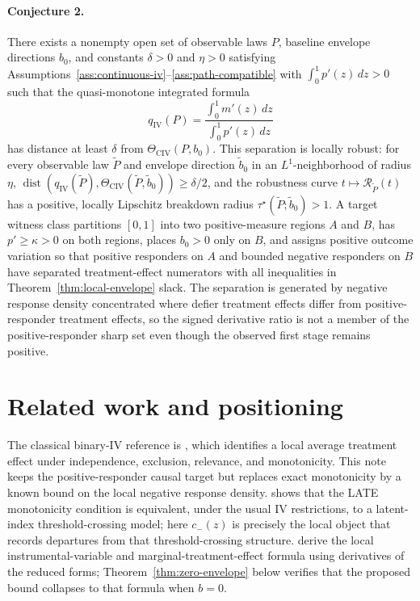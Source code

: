 \documentclass[11pt]{article}
\theoremstyle{definition}
\theoremstyle{plain}
\theoremstyle{remark}
\begin{document}
\paragraph{Conjecture 2.}\label{conj:strict-separation}
There exists a nonempty open set of observable laws \(P\), baseline envelope directions \(b_0\), and constants \(\delta>0\) and \(\eta>0\) satisfying Assumptions~\ref{ass:continuous-iv}--\ref{ass:path-compatible} with \(\int_0^1 p'(z)\,dz>0\) such that the quasi-monotone integrated formula
\[
q_{\mathrm{IV}}(P)=\frac{\int_0^1 m'(z)\,dz}{\int_0^1 p'(z)\,dz}
\]
has distance at least \(\delta\) from \(\Theta_{\mathrm{CIV}}(P,b_0)\).  This separation is locally robust: for every observable law \(\widetilde P\) and envelope direction \(\widetilde b_0\) in an \(L^1\)-neighborhood of radius \(\eta\), \(\operatorname{dist}(q_{\mathrm{IV}}(\widetilde P),\Theta_{\mathrm{CIV}}(\widetilde P,\widetilde b_0))\ge\delta/2\), and the robustness curve \(t\mapsto\mathcal R_{\widetilde P}(t)\) has a positive, locally Lipschitz breakdown radius \(\tau^\star(\widetilde P;\widetilde b_0)>1\).  A target witness class partitions \([0,1]\) into two positive-measure regions \(A\) and \(B\), has \(p'\ge\kappa>0\) on both regions, places \(b_0>0\) only on \(B\), and assigns positive outcome variation so that positive responders on \(A\) and bounded negative responders on \(B\) have separated treatment-effect numerators with all inequalities in Theorem~\ref{thm:local-envelope} slack.  The separation is generated by negative response density concentrated where defier treatment effects differ from positive-responder treatment effects, so the signed derivative ratio is not a member of the positive-responder sharp set even though the observed first stage remains positive.

\section{Related work and positioning}
The classical binary-IV reference is \cite{ImbensAngrist1994}, which identifies
a local average treatment effect under independence, exclusion, relevance, and
monotonicity.  This note keeps the positive-responder causal target but replaces
exact monotonicity by a known bound on the local negative response density.
\cite{Vytlacil2002} shows that the LATE monotonicity condition is equivalent,
under the usual IV restrictions, to a latent-index threshold-crossing model;
here \(c_-(z)\) is precisely the local object that records departures from that
threshold-crossing structure.  \cite{HeckmanVytlacil2005} derive the local
instrumental-variable and marginal-treatment-effect formula using derivatives
of the reduced forms; Theorem~\ref{thm:zero-envelope} below verifies that
the proposed bound collapses to that formula when \(b=0\).
\end{document}
